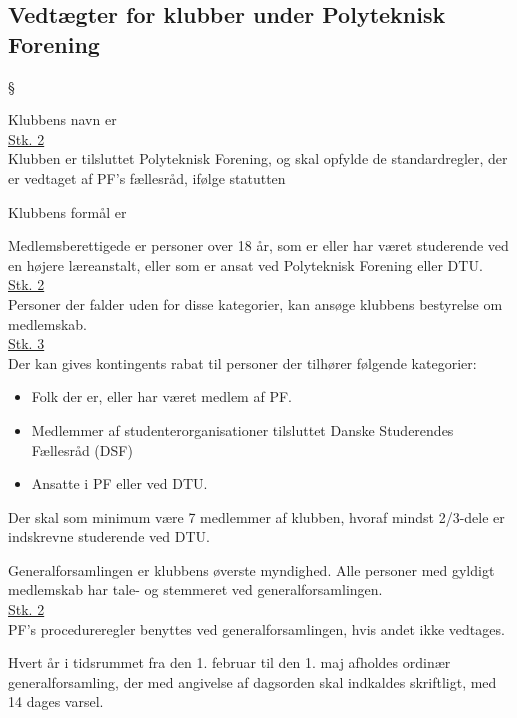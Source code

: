 \subsection{Vedtægter for klubber under Polyteknisk Forening}
\begin{list}
{\S {}}{}
\item Klubbens navn er \makebox[2in]{\hrulefill}\\

\underline{Stk. 2}\\ 
Klubben er tilsluttet Polyteknisk Forening, og skal opfylde de standardregler, der er vedtaget af PF's
fællesråd, ifølge statutten 
\item Klubbens formål er \makebox[2in]{\hrulefill}
\item Medlemsberettigede er personer over 18 år, som er eller har været studerende ved en højere læreanstalt, eller som er ansat ved Polyteknisk Forening eller DTU.\\

\underline{Stk. 2}\\
Personer der falder uden for disse kategorier, kan ansøge klubbens bestyrelse om medlemskab.\\

\underline{Stk. 3}\\
Der kan gives kontingents rabat til personer der tilhører følgende kategorier:
\begin{itemize}
\item Folk der er, eller har været medlem af PF.
\item Medlemmer af studenterorganisationer tilsluttet Danske Studerendes Fællesråd (DSF)
\item Ansatte i PF eller ved DTU.
\end{itemize}

\item Der skal som minimum være 7 medlemmer af klubben, hvoraf mindst 2/3-dele er indskrevne studerende ved DTU.

\item Generalforsamlingen er klubbens øverste myndighed. Alle personer med gyldigt medlemskab har tale- og stemmeret ved generalforsamlingen.\\

\underline{Stk. 2}\\
PF's procedureregler benyttes ved generalforsamlingen, hvis andet ikke vedtages.
\item Hvert år i tidsrummet fra den 1. februar til den 1. maj afholdes ordinær generalforsamling, der med angivelse af dagsorden skal indkaldes skriftligt, med 14 dages varsel.\\


\end{list}
